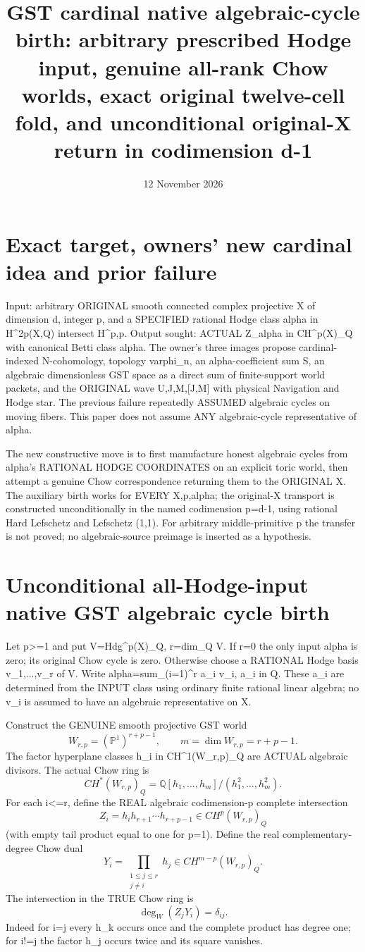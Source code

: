 \documentclass[11pt]{article}
\title{GST cardinal native algebraic-cycle birth: arbitrary prescribed Hodge input, genuine all-rank Chow worlds, exact original twelve-cell fold, and unconditional original-X return in codimension d-1}
\date{12 November 2026}
\begin{document}
\maketitle

\section{Exact target, owners' new cardinal idea and prior failure}
Input: arbitrary ORIGINAL smooth connected complex projective X of dimension d,
integer p, and a SPECIFIED rational Hodge class
alpha in H^{2p}(X,Q) intersect H^{p,p}.
Output sought: ACTUAL Z_alpha in CH^p(X)_Q with canonical Betti class alpha.
The owner's three images propose cardinal-indexed N-cohomology, topology
varphi_n, an alpha-coefficient sum S, an algebraic dimensionless GST space
as a direct sum of finite-support world packets, and the ORIGINAL
wave U,J,M,[J,M] with physical Navigation and Hodge star.
The previous failure repeatedly ASSUMED algebraic cycles on moving fibers.
This paper does not assume ANY algebraic-cycle representative of alpha.

The new constructive move is to first manufacture honest algebraic cycles
from alpha's RATIONAL HODGE COORDINATES on an explicit toric world, then
attempt a genuine Chow correspondence returning them to the ORIGINAL X.
The auxiliary birth works for EVERY X,p,alpha; the original-X
transport is constructed unconditionally in the named codimension
p=d-1, using rational Hard Lefschetz and Lefschetz (1,1).
For arbitrary middle-primitive p the transfer is not proved;
no algebraic-source preimage is inserted as a hypothesis.

\section{Unconditional all-Hodge-input native GST algebraic cycle birth}
Let p>=1 and put
V=Hdg^p(X)_Q, r=dim_Q V. If r=0 the only input alpha is
zero; its original Chow cycle is zero. Otherwise choose a
RATIONAL Hodge basis v_1,...,v_r of V.
Write alpha=sum_(i=1)^r a_i v_i, a_i in Q.
These a_i are determined from the INPUT class using
ordinary finite rational linear algebra; no v_i is
assumed to have an algebraic representative on X.

Construct the GENUINE smooth projective GST world
\[
\boxed{W_{r,p}=(\mathbb P^1)^{r+p-1},\qquad m=\dim W_{r,p}=r+p-1.}
\]
The factor hyperplane classes
h_i in CH^1(W_{r,p})_Q are ACTUAL algebraic divisors.
The actual Chow ring is
\[
CH^*(W_{r,p})_Q
=\mathbb Q[h_1,\ldots,h_m]/(h_1^2,\ldots,h_m^2).
\]
For each i<=r, define the REAL algebraic
codimension-p complete intersection
\[
Z_i=h_i h_{r+1}\cdots h_{r+p-1}\in CH^p(W_{r,p})_Q
\]
(with empty tail product equal to one for p=1).
Define the real complementary-degree Chow dual
\[
Y_i=\prod_{\substack{1\le j\le r\\j\ne i}}h_j
\in CH^{m-p}(W_{r,p})_Q.
\]
The intersection in the TRUE Chow ring is
\[
\boxed{\deg_W(Z_jY_i)=\delta_{ij}.}\tag{1}
\]
Indeed for i=j every h_k occurs once and the
complete product has degree one; for i!=j the
factor h_j occurs twice and its square vanishes.
\end{document}
